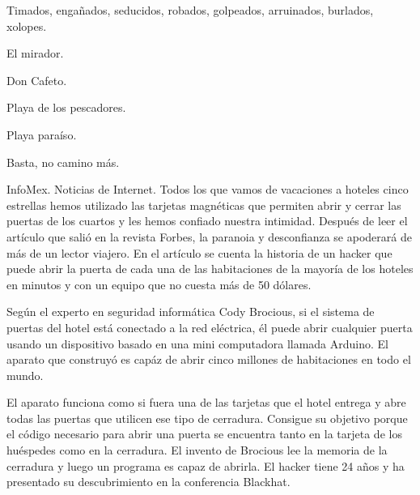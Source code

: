 \documentclass[11pt,twoside,openright,a6paper]{book}
\begin{document}
\vspace{0.5cm}
\hrulefill\hspace{0.2cm} \decofourleft\decofourright \hspace{0.2cm} \hrulefill
\vspace{0.5cm}

Timados, engañados, seducidos, robados, golpeados, arruinados, burlados, xolopes.


\vspace{0.5cm}
\hrulefill\hspace{0.2cm} \decofourleft\decofourright \hspace{0.2cm} \hrulefill
\vspace{0.5cm}

El mirador.

Don Cafeto.

Playa de los pescadores.

Playa paraíso.

Basta, no camino más.


\vspace{0.5cm}
\hrulefill\hspace{0.2cm} \decofourleft\decofourright \hspace{0.2cm} \hrulefill
\vspace{0.5cm}

InfoMex. Noticias de Internet. Todos los que vamos de vacaciones a hoteles
cinco estrellas hemos utilizado las tarjetas magnéticas que permiten
abrir y cerrar las puertas de los cuartos y les hemos confiado nuestra
intimidad. Después de leer el artículo que salió en la revista Forbes,
la paranoia y desconfianza se apoderará de más de un lector viajero. En
el artículo se cuenta la historia de un hacker que puede abrir la puerta
de cada una de las habitaciones de la mayoría de los hoteles en minutos
y con un equipo que no cuesta más de 50 dólares.

Según el experto en seguridad informática Cody Brocious, si el sistema
de puertas del hotel está conectado a la red eléctrica, él puede abrir
cualquier puerta usando un dispositivo basado en una mini computadora llamada
Arduino. El aparato que construyó es capáz de abrir cinco millones de
habitaciones en todo el mundo.

El aparato funciona como si fuera una de las tarjetas que el hotel entrega
y abre todas las puertas que utilicen ese tipo de cerradura. Consigue su
objetivo porque el código necesario para abrir una puerta se encuentra
tanto en la tarjeta de los huéspedes como en la cerradura. El invento de
Brocious lee la memoria de la cerradura y luego un programa es capaz de
abrirla. El hacker tiene 24 años y ha presentado su descubrimiento en la
conferencia Blackhat.
\end{document}
